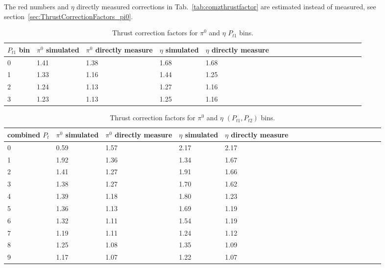 The red numbers and $\eta$ directly measured corrections in Tab.~\ref{tab:comzthrustfactor} are estimated instead of measured, see section~\ref{sec:ThrustCorrectionFactors_pi0}.
\begin{table}[H]\footnotesize
\centering
\begin{tabular}{|l|l|l|l|l|l|l|l|l|l|l|l|l|l|l|l|l|l|}
\hline
$P_{t1}$ bin & $\pi^0$ simulated & $\pi^0$ directly measure & $\eta$ simulated  & $\eta$ directly measure  \\ \hline
0	&	1.41	&	1.38	&	1.68	&	1.68	\\ \hline
1	&	1.33	&	1.16	&	1.44	&	1.25	\\ \hline
2	&	1.24	&	1.13	&	1.27	&	1.16	\\ \hline
3	&	1.23	&	1.13	&	1.25	&	1.16	\\ \hline
\end{tabular}
\caption{Thrust correction factors for $\pi^0$ and $\eta$ $P_{t1}$ bins.}
\label{tab:sinptthrustfactor_compare}
\end{table}

\begin{table}[H]\footnotesize
\centering
\begin{tabular}{|l|l|l|l|l|l|l|l|l|l|l|l|l|l|l|l|l|l|}
\hline
combined $P_t$ & $\pi^0$ simulated & $\pi^0$ directly measure & $\eta$   simulated  & $\eta$  directly measure  \\ \hline
0	&	0.59	&	1.57	&	2.17	&	2.17	\\ \hline
1	&	1.92	&	1.36	&	1.34	&	1.67	\\ \hline
2	&	1.41	&	1.27	&	1.91	&	1.66	\\ \hline
3	&	1.38	&	1.27	&	1.70	&	1.62	\\ \hline
4	&	1.39	&	1.18	&	1.80	&	1.23	\\ \hline
5	&	1.36	&	1.13	&	1.69	&	1.19	\\ \hline
6	&	1.32	&	1.11	&	1.54	&	1.19	\\ \hline
7	&	1.19	&	1.11	&	1.24	&	1.12	\\ \hline
8	&	1.25	&	1.08	&	1.35	&	1.09	\\ \hline
9	&	1.17	&	1.07	&	1.22	&	1.07	\\ \hline
\end{tabular}
\caption{Thrust correction factors for $\pi^0$ and $\eta$ $(P_{t1},P_{t2})$ bins.}
\label{tab:comptthrustfactor_compare}
\end{table}
\fi

